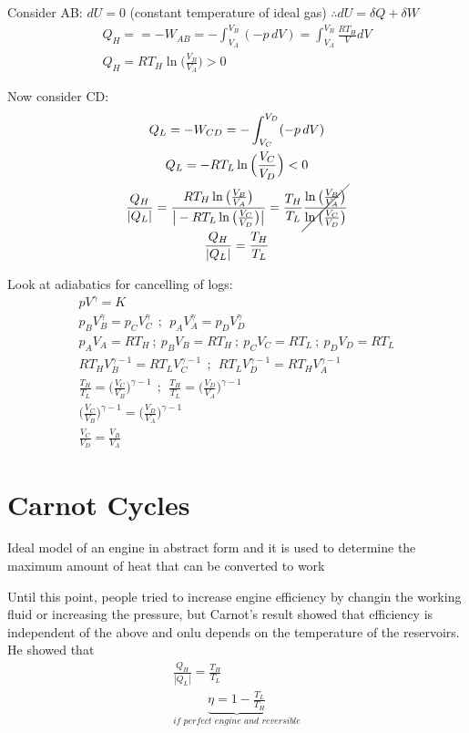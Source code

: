 \documentclass[a4paper, 11pt, normalem]{report}
\begin{document}
Consider AB: $dU = 0$ (constant temperature of ideal gas) $\therefore dU = \delta Q + \delta W$
\begin{gather*}
    Q_H = = -W_{AB} = - \int_{V_{A}}^{V_B} (-p\,dV) = \int_{V_A}^{V_B} \frac{RT_{H}}{V}dV \\
    Q_H = RT_{H}\ln\Big(\frac{V_B}{V_A}\Big) > 0
\end{gather*}

Now consider CD:
\begin{gather*}
    Q_L = -W_{CD} = - \int_{V_C}^{V_D} (-p\,dV) \\
    Q_L = -RT_L \ln\Big(\frac{V_C}{V_D}\Big) < 0 \\
    \frac{Q_H}{|Q_L|} = \frac{RT_{H}\ln\big(\tfrac{V_B}{V_A}\big)}{\big|-RT_L \ln\big(\tfrac{V_C}{V_D}\big)\big|} = \frac{T_H}{T_L} \cancel{\frac{\ln\big(\tfrac{V_B}{V_A}\big)}{\ln\big(\tfrac{V_C}{V_D}\big)}}\\
    \frac{Q_H}{|Q_L|} = \frac{T_H}{T_L}
\end{gather*}

Look at adiabatics for cancelling of logs:
\begin{gather*}
    pV^\gamma = K \\
    p_{B}V_{B}^{\gamma} = p_{C}V_{C}^{\gamma} ~~;~~ p_{A}V_{A}^{\gamma} = p_{D}V_{D}^{\gamma} \\
    p_A V_A = RT_H ~;~ p_B V_B = RT_H ~;~ p_C V_C = RT_L ~;~ p_D V_D = RT_L \\
    RT_H V_{B}^{\gamma - 1} = RT_L V_{C}^{\gamma - 1} ~~;~~ RT_{L}V_{D}^{\gamma - 1} = RT_{H}V_{A}^{\gamma - 1} \\
    \frac{T_H}{T_L} = \Big(\frac{V_C}{V_B}\Big)^{\gamma - 1} ~~;~~ \frac{T_H}{T_L} = \Big(\frac{V_D}{V_A}\Big)^{\gamma - 1} \\
    \Big(\frac{V_C}{V_B}\Big)^{\gamma - 1} = \Big(\frac{V_D}{V_A}\Big)^{\gamma - 1} \\
    \frac{V_C}{V_D} = \frac{V_B}{V_A}
\end{gather*}

\section{Carnot Cycles}
Ideal model of an engine in abstract form and it is used to determine the maximum amount of heat that can be converted to work

Until this point, people tried to increase engine efficiency by changin the working fluid or increasing the pressure, but Carnot's result showed that efficiency is independent of the above and onlu depends on the temperature of the reservoirs. \\
He showed that
\begin{gather*}
    \frac{Q_H}{|Q_L|} = \frac{T_H}{T_L} \\
    \underbrace{\eta = 1 - \frac{T_L}{T_H}}_{\textit{if perfect engine and reversible}}
\end{gather*}
\end{document}
